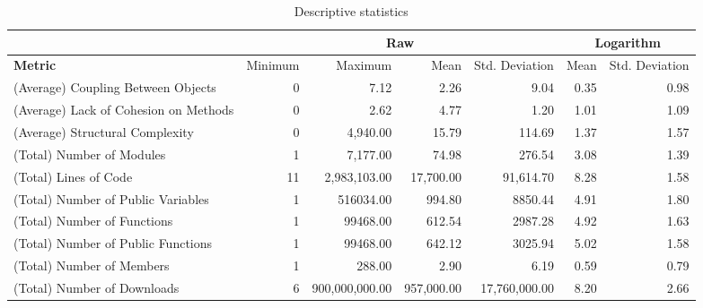 \documentclass[conference]{IEEEtran}
\begin{document}
\begin{center}
\begin{table}[hbt]
\centering \caption{Descriptive statistics}
\begin{tabular}{|l|r|r|r|r|r|r|} \hline
  & \multicolumn{4}{|c|}{Raw} & \multicolumn{2}{|c|}{Logarithm}\\ \hline

\textbf{Metric} 	    & Minimum & Maximum        & Mean      & Std. Deviation & Mean & Std. Deviation \\ \hline

(Average) Coupling Between Objects      & 0    & 7.12        & 2.26      & 9.04           & 0.35 & 0.98 \\ \hline

(Average) Lack of Cohesion on Methods   & 0    & 2.62        & 4.77      & 1.20           & 1.01 & 1.09 \\ \hline

(Average) Structural Complexity         & 0    & 4,940.00       & 15.79     & 114.69         & 1.37 & 1.57 \\ \hline

(Total) Number of Modules               & 1    & 7,177.00       & 74.98     & 276.54         & 3.08 & 1.39 \\ \hline

(Total) Lines of Code                   & 11   & 2,983,103.00  & 17,700.00 & 91,614.70      & 8.28 & 1.58 \\ \hline

(Total) Number of Public Variables      & 1    & 516034.00      & 994.80    & 8850.44        & 4.91 & 1.80 \\ \hline

(Total) Number of Functions	        & 1    & 99468.00       & 612.54    & 2987.28        & 4.92 & 1.63 \\ \hline

(Total) Number of Public Functions      & 1    & 99468.00       & 642.12    & 3025.94        & 5.02 & 1.58 \\ \hline

(Total) Number of Members               & 1    & 288.00         & 2.90       & 6.19          & 0.59 & 0.79 \\ \hline

(Total) Number of Downloads             & 6    & 900,000,000.00   & 957,000.00 & 17,760,000.00 & 8.20 & 2.66 \\ \hline

\end{tabular}
\label{table:statistics}
\end{table}
\end{center}
\end{document}
